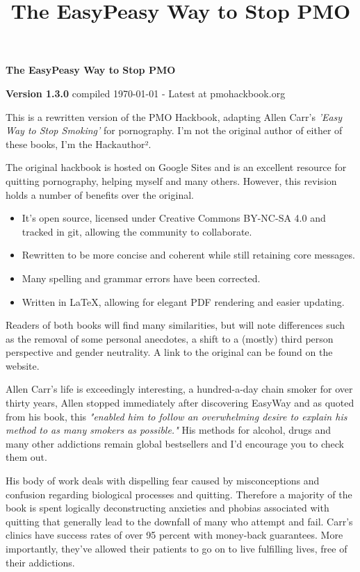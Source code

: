 \documentclass[easypeasy.tex]{subfiles}
\title {The EasyPeasy Way to Stop PMO}
\begin{document}
\thispagestyle{empty}

\begin{center}
  {\Huge\bfseries The EasyPeasy Way to Stop PMO \par}
  {\small \textbf{Version 1.3.0} compiled {\today} - Latest at pmohackbook.org}
\end{center}

This is a rewritten version of the PMO Hackbook, adapting Allen Carr's \textit{'Easy Way to Stop Smoking'} for pornography. I'm not the original author of either of these books, I'm the Hackauthor².

The original hackbook is hosted on Google Sites and is an excellent resource for quitting pornography, helping myself and many others. However, this revision holds a number of benefits over the original.
\begin{itemize}
\item It's open source, licensed under Creative Commons BY-NC-SA 4.0 and tracked in git, allowing the community to collaborate.
\item Rewritten to be more concise and coherent while still retaining core messages.
\item Many spelling and grammar errors have been corrected.
\item Written in LaTeX, allowing for elegant PDF rendering and easier updating.
\end{itemize}

Readers of both books will find many similarities, but will note differences such as the removal of some personal anecdotes, a shift to a (mostly) third person perspective and gender neutrality. A link to the original can be found on the website.

Allen Carr's life is exceedingly interesting, a hundred-a-day chain smoker for over thirty years, Allen stopped immediately after discovering EasyWay and as quoted from his book, this \textit{"enabled him to follow an overwhelming desire to explain his method to as many smokers as possible."} His methods for alcohol, drugs and many other addictions remain global bestsellers and I'd encourage you to check them out.

His body of work deals with dispelling fear caused by misconceptions and confusion regarding biological processes and quitting. Therefore a majority of the book is spent logically deconstructing anxieties and phobias associated with quitting that generally lead to the downfall of many who attempt and fail. Carr's clinics have success rates of over 95 percent with money-back guarantees. More importantly, they've allowed their patients to go on to live fulfilling lives, free of their addictions.
\end{document}
